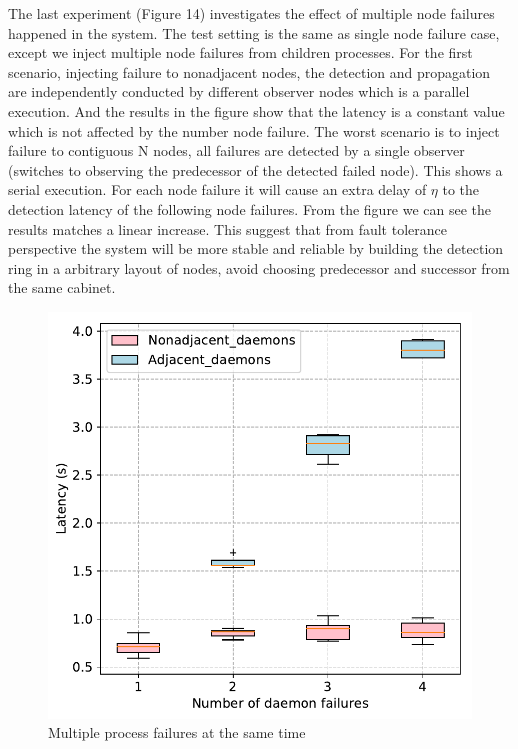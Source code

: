 \documentclass[sigconf]{acmart}
\begin{document}
The last experiment (Figure 14) investigates the effect of multiple node failures happened in the system. The test setting is the same as single node failure case, except we inject multiple node failures from children processes. For the first scenario, injecting failure to nonadjacent nodes, the detection and propagation are independently conducted by different observer nodes which is a parallel execution. And the results in the figure show that the latency is a constant value which is not affected by the number node failure. The worst scenario is to inject failure to contiguous N nodes, all failures are detected by a single observer (switches to observing the predecessor of the detected failed node). This shows a serial execution. For each node failure it will cause an extra delay of $ \eta $ to the detection latency of the following node failures. From the figure we can see the results matches a linear increase. This suggest that from fault tolerance perspective the system will be more stable and reliable by building the detection ring in a arbitrary layout of nodes, avoid choosing predecessor and successor from the same cabinet.  

\begin{figure}[h]
  \centering
  \includegraphics[width=\linewidth]{multi_daemon_failures.pdf}
  \caption{Multiple process failures at the same time}
\end{figure}
\end{document}
